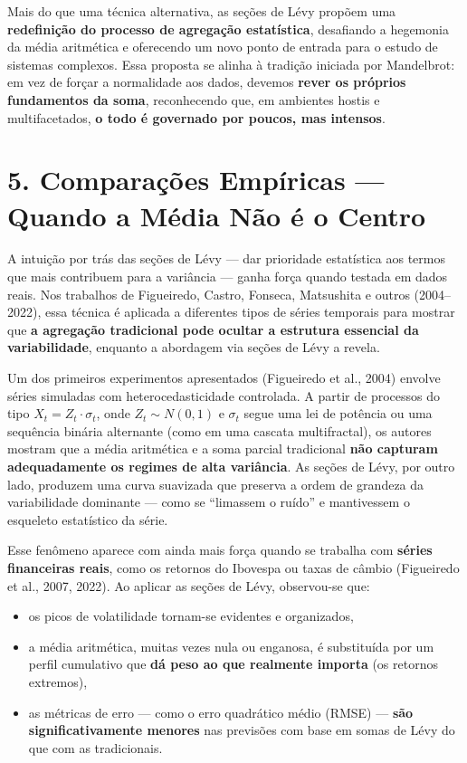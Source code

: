 \documentclass[
  portuguese,
]{agujournal2019}
\providecommand{\tightlist}{%
  \setlength{\itemsep}{0pt}\setlength{\parskip}{0pt}}
\begin{document}
Mais do que uma técnica alternativa, as seções de Lévy propõem uma
\textbf{redefinição do processo de agregação estatística}, desafiando a
hegemonia da média aritmética e oferecendo um novo ponto de entrada para
o estudo de sistemas complexos. Essa proposta se alinha à tradição
iniciada por Mandelbrot: em vez de forçar a normalidade aos dados,
devemos \textbf{rever os próprios fundamentos da soma}, reconhecendo
que, em ambientes hostis e multifacetados, \textbf{o todo é governado
por poucos, mas intensos}.

\section{5. Comparações Empíricas --- Quando a Média Não é o
Centro}\label{comparauxe7uxf5es-empuxedricas-quando-a-muxe9dia-nuxe3o-uxe9-o-centro}

A intuição por trás das seções de Lévy --- dar prioridade estatística
aos termos que mais contribuem para a variância --- ganha força quando
testada em dados reais. Nos trabalhos de Figueiredo, Castro, Fonseca,
Matsushita e outros (2004--2022), essa técnica é aplicada a diferentes
tipos de séries temporais para mostrar que \textbf{a agregação
tradicional pode ocultar a estrutura essencial da variabilidade},
enquanto a abordagem via seções de Lévy a revela.

Um dos primeiros experimentos apresentados (Figueiredo et al., 2004)
envolve séries simuladas com heterocedasticidade controlada. A partir de
processos do tipo \(X_t = Z_t \cdot \sigma_t\), onde \(Z_t \sim N(0,1)\)
e \(\sigma_t\) segue uma lei de potência ou uma sequência binária
alternante (como em uma cascata multifractal), os autores mostram que a
média aritmética e a soma parcial tradicional \textbf{não capturam
adequadamente os regimes de alta variância}. As seções de Lévy, por
outro lado, produzem uma curva suavizada que preserva a ordem de
grandeza da variabilidade dominante --- como se ``limassem o ruído'' e
mantivessem o esqueleto estatístico da série.

Esse fenômeno aparece com ainda mais força quando se trabalha com
\textbf{séries financeiras reais}, como os retornos do Ibovespa ou taxas
de câmbio (Figueiredo et al., 2007, 2022). Ao aplicar as seções de Lévy,
observou-se que:

\begin{itemize}
\tightlist
\item
  os picos de volatilidade tornam-se evidentes e organizados,
\item
  a média aritmética, muitas vezes nula ou enganosa, é substituída por
  um perfil cumulativo que \textbf{dá peso ao que realmente importa} (os
  retornos extremos),
\item
  as métricas de erro --- como o erro quadrático médio (RMSE) ---
  \textbf{são significativamente menores} nas previsões com base em
  somas de Lévy do que com as tradicionais.
\end{itemize}
\end{document}
